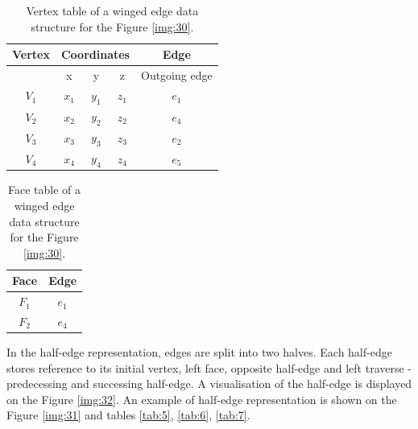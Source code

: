 \begin{table}[]
    \centering
    \begin{tabular}{|c|ccc|c|}
    \hline
    \hline
    Vertex  & \multicolumn{3}{c|}{Coordinates}          & Edge            \\ \hline
          & x            & y            & z           & Outgoing edge   \\ \hline\hline
    $V_1$ & $x_1$        & $y_1$        & $z_1$       & $e_1$           \\ \hline
    $V_2$ & $x_2$        & $y_2$        & $z_2$       & $e_4$           \\ \hline
    $V_3$ & $x_3$        & $y_3$        & $z_3$       & $e_2$           \\ \hline
    $V_4$ & $x_4$        & $y_4$        & $z_4$       & $e_5$           \\ \hline\hline
    \end{tabular}
\caption{Vertex table of a winged edge data structure for the Figure \ref{img:30}.}
\label{tab:3}
\end{table}

\begin{table}[]
    \centering
    \begin{tabular}{|c|c|}
    \hline
    \hline
    Face  & Edge            \\ \hline\hline
    $F_1$ & $e_1$           \\ \hline
    $F_2$ & $e_4$           \\ \hline\hline
    \end{tabular}
\caption{Face table of a winged edge data structure for the Figure \ref{img:30}.}
\label{tab:4}
\end{table}

In the half-edge representation, edges are split into two halves. Each half-edge
stores reference to its initial vertex, left face, opposite half-edge and left
traverse - predecessing and successing half-edge. A visualisation of the
half-edge is displayed on the Figure \ref{img:32}. An example of half-edge
representation is shown on the Figure \ref{img:31} and tables 
\ref{tab:5}, \ref{tab:6}, \ref{tab:7}.

